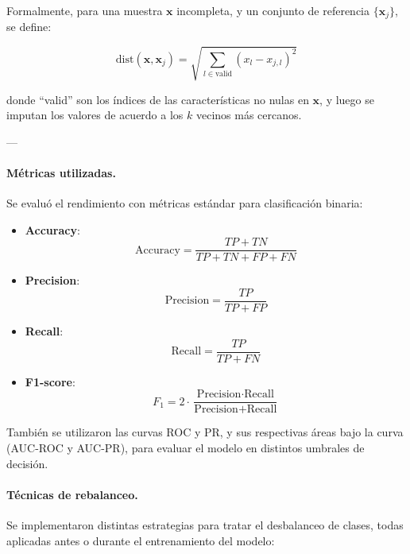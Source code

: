 \documentclass[11pt]{article}
\begin{document}
Formalmente, para una muestra $\mathbf{x}$ incompleta, y un conjunto de referencia $\{\mathbf{x}_j\}$, se define:

\[
\text{dist}(\mathbf{x}, \mathbf{x}_j) = \sqrt{ \sum_{l \in \text{valid}} (x_l - x_{j,l})^2 }
\]

donde “valid” son los índices de las características no nulas en $\mathbf{x}$, y luego se imputan los valores de acuerdo a los $k$ vecinos más cercanos.

---

\paragraph{Métricas utilizadas.}

Se evaluó el rendimiento con métricas estándar para clasificación binaria:

\begin{itemize}
    \item \textbf{Accuracy}:
    \[
    \text{Accuracy} = \frac{TP + TN}{TP + TN + FP + FN}
    \]
    \item \textbf{Precision}:
    \[
    \text{Precision} = \frac{TP}{TP + FP}
    \]
    \item \textbf{Recall}:
    \[
    \text{Recall} = \frac{TP}{TP + FN}
    \]
    \item \textbf{F1-score}:
    \[
    F_1 = 2 \cdot \frac{\text{Precision} \cdot \text{Recall}}{\text{Precision} + \text{Recall}}
    \]
\end{itemize}

También se utilizaron las curvas ROC y PR, y sus respectivas áreas bajo la curva (AUC-ROC y AUC-PR), para evaluar el modelo en distintos umbrales de decisión.


\paragraph{Técnicas de rebalanceo.}

Se implementaron distintas estrategias para tratar el desbalanceo de clases, todas aplicadas antes o durante el entrenamiento del modelo:
\end{document}
